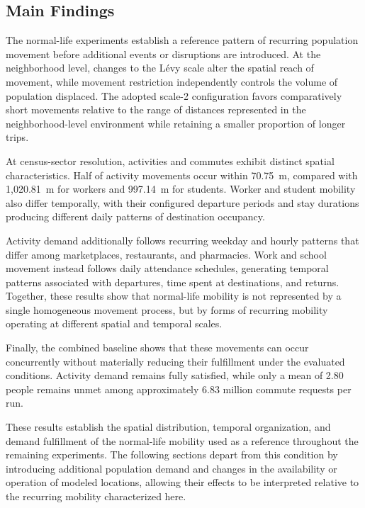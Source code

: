 \subsection{Main Findings}
\label{sec:routine_mobility_findings}

The normal-life experiments establish a reference pattern of recurring population movement before additional events or disruptions are introduced. At the neighborhood level, changes to the Lévy scale alter the spatial reach of movement, while movement restriction independently controls the volume of population displaced. The adopted scale-2 configuration favors comparatively short movements relative to the range of distances represented in the neighborhood-level environment while retaining a smaller proportion of longer trips.

At census-sector resolution, activities and commutes exhibit distinct spatial characteristics. Half of activity movements occur within 70.75~m, compared with 1,020.81~m for workers and 997.14~m for students. Worker and student mobility also differ temporally, with their configured departure periods and stay durations producing different daily patterns of destination occupancy.

Activity demand additionally follows recurring weekday and hourly patterns that differ among marketplaces, restaurants, and pharmacies. Work and school movement instead follows daily attendance schedules, generating temporal patterns associated with departures, time spent at destinations, and returns. Together, these results show that normal-life mobility is not represented by a single homogeneous movement process, but by forms of recurring mobility operating at different spatial and temporal scales.

Finally, the combined baseline shows that these movements can occur concurrently without materially reducing their fulfillment under the evaluated conditions. Activity demand remains fully satisfied, while only a mean of 2.80 people remains unmet among approximately 6.83 million commute requests per run.

These results establish the spatial distribution, temporal organization, and demand fulfillment of the normal-life mobility used as a reference throughout the remaining experiments. The following sections depart from this condition by introducing additional population demand and changes in the availability or operation of modeled locations, allowing their effects to be interpreted relative to the recurring mobility characterized here.


